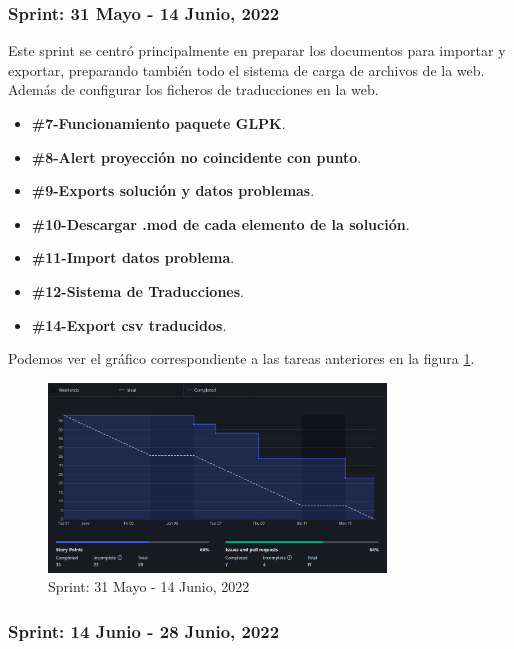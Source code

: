 \newpage

\subsubsection{Sprint: 31 Mayo - 14 Junio, 2022}

Este sprint se centró principalmente en preparar los documentos para importar y exportar, preparando también todo el sistema de carga de archivos de la web. Además de configurar los ficheros de traducciones en la web.

\begin{itemize}
    \item \textbf{\#7-Funcionamiento paquete GLPK}.
    \item \textbf{\#8-Alert proyección no coincidente con punto}.
    \item \textbf{\#9-Exports solución y datos problemas}.
    \item \textbf{\#10-Descargar .mod de cada elemento de la solución}.
    \item \textbf{\#11-Import datos problema}.
    \item \textbf{\#12-Sistema de Traducciones}.
    \item \textbf{\#14-Export csv traducidos}.
\end{itemize}

Podemos ver el gráfico correspondiente a las tareas anteriores en la figura \ref{fig:sprint_31_14_jun}.

\begin{figure}[h!] 
\centering
    \includegraphics[width=0.8\textwidth]{img/sprint_31_14_jun.PNG}
\caption{Sprint: 31 Mayo - 14 Junio, 2022}
\label{fig:sprint_31_14_jun}
\end{figure}

\subsubsection{Sprint: 14 Junio - 28 Junio, 2022}

